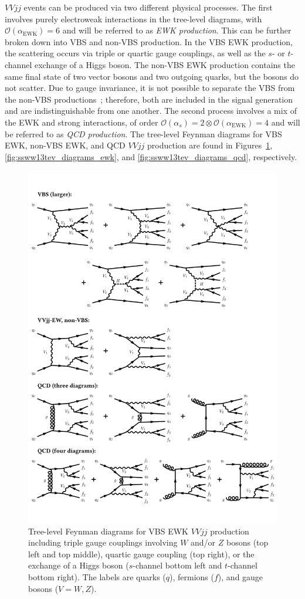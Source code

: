 $VVjj$ events can be produced via two different physical processes.
The first involves purely electroweak interactions in the tree-level diagrams, with $\mathcal{O}(\alpha_{\textrm{EWK}}) = 6$ %
and will be referred to as \emph{EWK production}.
This can be further broken down into VBS and non-VBS production.
In the VBS EWK production, the scattering occurs via triple or quartic gauge couplings, as well as the $s$- or $t$-channel exchange of a Higgs boson.
The non-VBS EWK production contains the same final state of two vector bosons and two outgoing quarks, but the bosons do not scatter.
Due to gauge invariance, it is not possible to separate the VBS from the non-VBS productions~\cite{2006.isolating-vbs-lhc}; therefore, both are included in the signal generation and are indistinguishable from one another.
The second process involves a mix of the EWK and strong interactions, of order $\mathcal{O}(\alpha_s) = 2 \otimes \mathcal{O}(\alpha_{\textrm{EWK}}) = 4$ and will be referred to as \emph{QCD production}.
The tree-level Feynman diagrams for VBS EWK, non-VBS EWK, and QCD $VVjj$ production are found in Figures~\ref{fig:ssww13tev_diagrams_vbs}, \ref{fig:ssww13tev_diagrams_ewk}, and \ref{fig:ssww13tev_diagrams_qcd}, respectively.

\begin{figure}[htbp]
  \centering
  \includegraphics[width=.8\textwidth]{figs/ssww_13tev/diagrams/Vbscore}
  \caption{Tree-level Feynman diagrams for VBS EWK $VVjj$ production including triple gauge couplings involving $W$ and/or $Z$ bosons (top left and top middle), quartic gauge coupling (top right), or the exchange of a Higgs boson ($s$-channel bottom left and $t$-channel bottom right).  The labels are quarks ($q$), fermions ($f$), and gauge bosons ($V = W,Z$).}
  \label{fig:ssww13tev_diagrams_vbs}
\end{figure}

